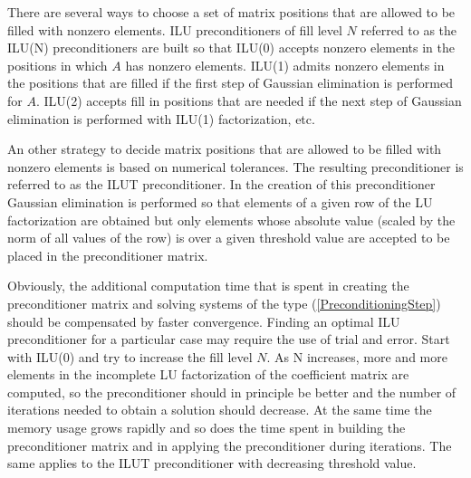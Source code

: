 There are several ways to choose a set of matrix positions that are allowed to be filled 
with nonzero elements. ILU preconditioners of fill level $N$ referred to 
as the ILU(N) preconditioners are built so that ILU(0) accepts nonzero elements in the positions 
in which $A$ has nonzero elements. ILU(1) admits nonzero elements in the positions that are 
filled if the first step of Gaussian elimination is performed for $A$. 
ILU(2) accepts fill in positions that are needed if the next step of Gaussian 
elimination is performed with ILU(1) factorization, etc.    

An other strategy to decide matrix positions that are allowed to be filled 
with nonzero elements is based on numerical tolerances. The resulting preconditioner is 
referred to as the ILUT preconditioner. In the creation of this preconditioner   
Gaussian elimination is performed so that elements of a given
row of the LU factorization are obtained but only elements whose absolute
value (scaled by the norm of all values of the row) is over a given threshold value 
are accepted to be placed in the preconditioner matrix.

Obviously, the additional computation time that is spent in creating the preconditioner
matrix and solving systems of the type (\ref{PreconditioningStep}) 
should be compensated by faster convergence. Finding an optimal ILU preconditioner for
a particular case may require the use of trial and error. Start with ILU(0) and 
try to increase the fill level $N$. 
As N increases, more and more elements in the incomplete LU factorization of the coefficient 
matrix are computed, so the preconditioner should in principle be better and the number of iterations 
needed to obtain a solution should decrease. At the same time the memory usage grows rapidly and 
so does the time spent 
in building the preconditioner matrix and in applying the preconditioner during iterations. 
The same applies to the ILUT preconditioner with decreasing threshold value.  
      

